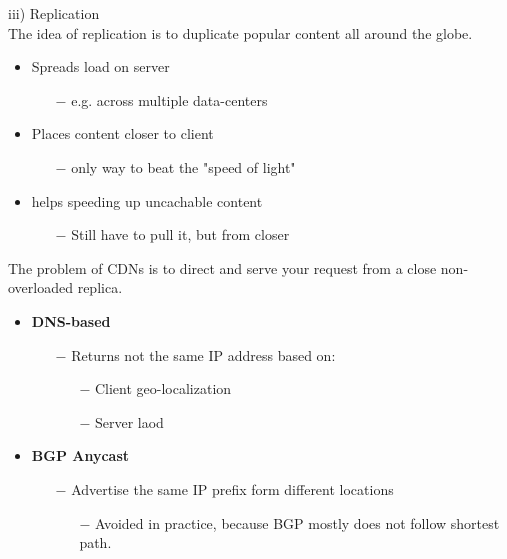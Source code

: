 \documentclass[a4paper, fontsize=8pt, landscape, DIV=1]{scrartcl}
\begin{document}
\begin{multicols*}{4}
		iii) Replication\\
		The idea of replication is to duplicate popular content all around the globe.
		\begin{itemize}[noitemsep]
			\item Spreads load on server
			\begin{itemize}
				\item[$-$] e.g. across multiple data-centers
			\end{itemize}
			\item Places content closer to client
			\begin{itemize}
				\item[$-$] only way to beat the "speed of light"
			\end{itemize}
			\item helps speeding up uncachable content
			\begin{itemize}
				\item[$-$] Still have to pull it, but from closer
			\end{itemize}
		\end{itemize}
		The problem of CDNs is to direct and serve your request from a close non-overloaded replica.
		\begin{itemize}[noitemsep]
			\item \textbf{DNS-based}
			\begin{itemize}
				\item[$-$] Returns not the same IP address based on:
				\begin{itemize}
					\item[$-$] Client geo-localization
					\item[$-$] Server laod
				\end{itemize}
			\end{itemize}
			\item \textbf{BGP Anycast}
			\begin{itemize}
				\item[$-$] Advertise the same IP prefix form different locations
				\begin{itemize}
					\item[$-$] Avoided in practice, because BGP mostly does not follow shortest path. 
				\end{itemize}
			\end{itemize}
		\end{itemize} 
		

\end{multicols*}
\end{document}
